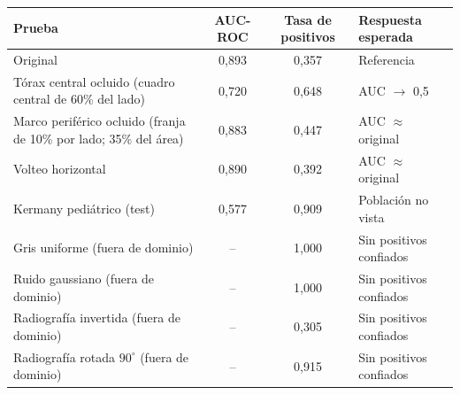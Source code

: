 \begin{tabular}{lccl}
\toprule
Prueba & AUC-ROC & Tasa de positivos & Respuesta esperada \\
\midrule
Original & 0{,}893 & 0{,}357 & Referencia \\
Tórax central ocluido (cuadro central de 60\% del lado) & 0{,}720 & 0{,}648 & AUC $\to$ 0,5 \\
Marco periférico ocluido (franja de 10\% por lado; 35\% del área) & 0{,}883 & 0{,}447 & AUC $\approx$ original \\
Volteo horizontal & 0{,}890 & 0{,}392 & AUC $\approx$ original \\
Kermany pediátrico (test) & 0{,}577 & 0{,}909 & Población no vista \\
\midrule
Gris uniforme (fuera de dominio) & -- & 1{,}000 & Sin positivos confiados \\
Ruido gaussiano (fuera de dominio) & -- & 1{,}000 & Sin positivos confiados \\
Radiografía invertida (fuera de dominio) & -- & 0{,}305 & Sin positivos confiados \\
Radiografía rotada $90^\circ$ (fuera de dominio) & -- & 0{,}915 & Sin positivos confiados \\
\bottomrule
\end{tabular}
